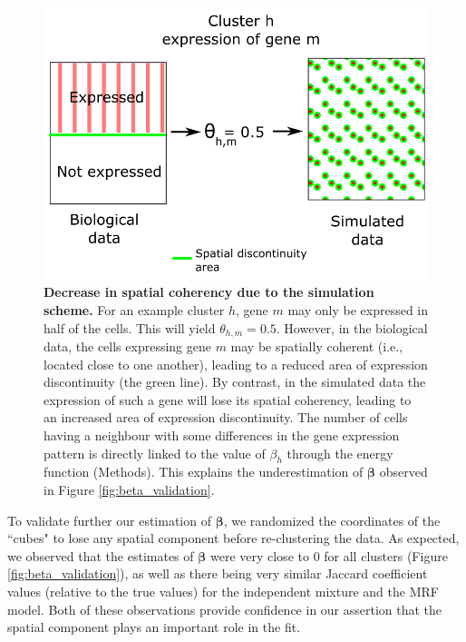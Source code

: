 	\begin{figure}[h]
\centerline{\includegraphics[width=\linewidth]{gfx/chapter5/beta_error.png}}
\caption{{\bf Decrease in spatial coherency due to the simulation scheme.} For an example cluster $h$, gene $m$ may only be expressed in half of the cells. This will yield $\theta_{h,m} = 0.5$. However, in the biological data, the cells expressing gene $m$ may be spatially coherent (i.e., located close to one another), leading to a reduced area of expression discontinuity (the green line). By contrast, in the simulated data the expression of such a gene will lose its spatial coherency, leading to an increased area of expression discontinuity. The number of cells having a neighbour with some differences in the gene expression pattern is directly linked to the value of $\beta_h$ through the energy function (Methods). This explains the underestimation of $\mathbf{\beta}$ observed in Figure \ref{fig:beta_validation}.}
\label{fig:beta_error}
	\end{figure}

To validate further our estimation of $\mathbf{\beta}$, we randomized the coordinates of the ``cubes" to lose any spatial component before re-clustering the data. As expected, we observed that the estimates of $\mathbf{\beta}$ were very close to $0$ for all clusters (Figure \ref{fig:beta_validation}),  as well as there being very similar Jaccard coefficient values (relative to the true values) for the independent mixture and the MRF model. Both of these observations provide confidence in our assertion that the spatial component plays an important role in the fit.\\



